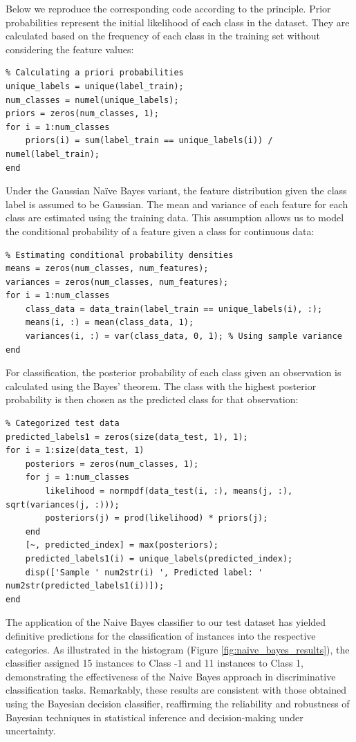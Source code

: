\documentclass[12pt, onecolumn]{article}
\begin{document}
Below we reproduce the corresponding code according to the principle. Prior probabilities represent the initial likelihood of each class in the dataset. They are calculated based on the frequency of each class in the training set without considering the feature values:

\begin{verbatim}
% Calculating a priori probabilities
unique_labels = unique(label_train);
num_classes = numel(unique_labels);
priors = zeros(num_classes, 1);
for i = 1:num_classes
    priors(i) = sum(label_train == unique_labels(i)) / numel(label_train);
end
\end{verbatim}

Under the Gaussian Naïve Bayes variant, the feature distribution given the class label is assumed to be Gaussian. The mean and variance of each feature for each class are estimated using the training data. This assumption allows us to model the conditional probability of a feature given a class for continuous data:

\begin{verbatim}
% Estimating conditional probability densities
means = zeros(num_classes, num_features);
variances = zeros(num_classes, num_features);
for i = 1:num_classes
    class_data = data_train(label_train == unique_labels(i), :);
    means(i, :) = mean(class_data, 1);
    variances(i, :) = var(class_data, 0, 1); % Using sample variance
end
\end{verbatim}

For classification, the posterior probability of each class given an observation is calculated using the Bayes' theorem. The class with the highest posterior probability is then chosen as the predicted class for that observation:

\begin{verbatim}
% Categorized test data
predicted_labels1 = zeros(size(data_test, 1), 1);
for i = 1:size(data_test, 1)
    posteriors = zeros(num_classes, 1);
    for j = 1:num_classes
        likelihood = normpdf(data_test(i, :), means(j, :), sqrt(variances(j, :)));
        posteriors(j) = prod(likelihood) * priors(j);
    end
    [~, predicted_index] = max(posteriors);
    predicted_labels1(i) = unique_labels(predicted_index);
    disp(['Sample ' num2str(i) ', Predicted label: ' num2str(predicted_labels1(i))]);
end
\end{verbatim}

The application of the Naive Bayes classifier to our test dataset has yielded definitive predictions for the classification of instances into the respective categories. As illustrated in the histogram (Figure \ref{fig:naive_bayes_results}), the classifier assigned 15 instances to Class -1 and 11 instances to Class 1, demonstrating the effectiveness of the Naive Bayes approach in discriminative classification tasks. Remarkably, these results are consistent with those obtained using the Bayesian decision classifier, reaffirming the reliability and robustness of Bayesian techniques in statistical inference and decision-making under uncertainty.
\end{document}
